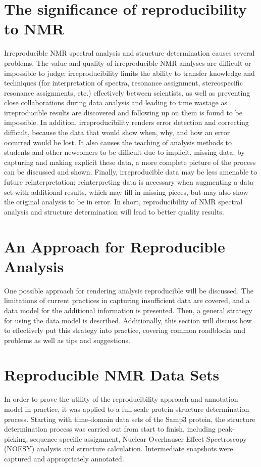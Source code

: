 \section{The significance of reproducibility to NMR}
Irreproducible NMR spectral analysis and structure determination causes 
several problems.  The value and 
quality of irreproducible NMR analyses are difficult or impossible to judge; 
irreproducibility limits the ability to transfer knowledge and techniques 
(for interpretation of spectra, resonance assignment, stereospecific resonance 
assignments, etc.) effectively between scientists, as well as preventing close 
collaborations during data analysis and leading to time wastage as 
irreproducible results are discovered and following up on them is found to be 
impossible.  In addition, irreproducibility renders error detection and 
correcting difficult, because the data that would show when, why, and how an 
error occurred would be lost.  It also causes the teaching of analysis methods 
to students and other newcomers to be difficult due to implicit, missing data; 
by capturing and making explicit these data, a more complete picture of the 
process can be discussed and shown.  Finally, irreproducible data may be less 
amenable to future reinterpretation; reinterpreting data is necessary when 
augmenting a data set with additional results, which may fill in missing 
pieces, but may also show the original analysis to be in error.  In short, 
reproducibility of NMR spectral analysis and structure determination will lead 
to better quality results.


\section{An Approach for Reproducible Analysis}
One possible approach for rendering analysis reproducible will be discussed.
The limitations of current practices in capturing insufficient data are 
covered, and a data model for the additional information is presented.
Then, a general strategy for using the data model is described.
Additionally, this section will discuss how to effectively put this strategy 
into practice, covering common roadblocks and problems as well as tips and 
suggestions.


\section{Reproducible NMR Data Sets}
In order to prove the utility of the reproducibility approach and annotation 
model in practice, it was applied to a full-scale protein structure 
determination process.  Starting with time-domain data sets of the Samp3 
protein, the structure determination process was carried out from start to 
finish, including peak-picking, sequence-specific assignment, 
Nuclear Overhauser Effect Spectroscopy (NOESY) analysis 
and structure calculation.  Intermediate snapshots were captured and 
appropriately annotated.

